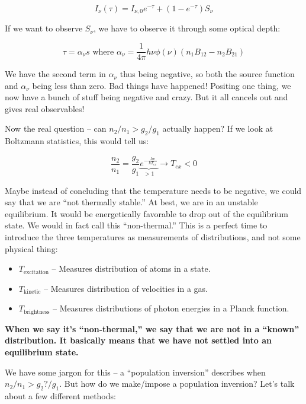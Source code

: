 \documentclass{article}
\newcommand{\be}{\begin{equation}}
\newcommand{\ee}{\end{equation}}
\def\bto{{B_{21}}}
\def\bot{{B_{12}}}
\def\bto{{B_{21}}}
\def\bot{{B_{12}}}
\def\bto{{B_{21}}}
\def\bot{{B_{12}}}
\begin{document}
\begin{equation}
    I_\nu (\tau) = I_{\nu,0} e^{-\tau} + \left(1-e^{-\tau}\right) S_\nu
\end{equation}

If we want to observe $S_\nu$, we have to observe it through some optical depth:

\be
\tau = \alpha_\nu s \text{ where } \alpha_\nu = \frac{1}{4\pi} h\nu \phi(\nu) \left(n_1 \bot - n_2 \bto\right)
\ee

We have the second term in $\alpha_\nu$ thus being negative, so both the source function and $\alpha_\nu$ being less than zero. Bad things have happened! Positing one thing, we now have a bunch of stuff being negative and crazy. But it all cancels out and gives real observables! 

Now the real question -- can $n_2/n_1 > g_2/g_1$ actually happen? If we look at Boltzmann statistics, this would tell us:

\be
\frac{n_2}{n_1} = \frac{g_2}{g_1} \underbrace{e^{-\frac{h\nu}{kT_{ex}}}}_{>1} \rightarrow T_{ex} < 0
\ee

Maybe instead of concluding that the temperature needs to be negative, we could say that we are ``not thermally stable.'' At best, we are in an unstable equilibrium. It would be energetically favorable to drop out of the equilibrium state. We would in fact call this ``non-thermal.'' This is a perfect time to introduce the three temperatures as measurements of distributions, and not some physical thing:

\begin{itemize}
    \item $T_\text{excitation}$ -- Measures distribution of atoms in a state. 
    
    \item $T_\text{kinetic}$ -- Measures distribution of velocities in a gas.
    
    \item $T_\text{brightness}$ -- Measures distributions of photon energies in a Planck function.
\end{itemize}

\textbf{When we say it's ``non-thermal,'' we say that we are not in a ``known'' distribution. It basically means that we have not settled into an equilibrium state.} 

We have some jargon for this -- a ``population inversion'' describes when $n_2/n_1 > g_2?/g_1$. But how do we make/impose a population inversion? Let's talk about a few different methods:
\end{document}
